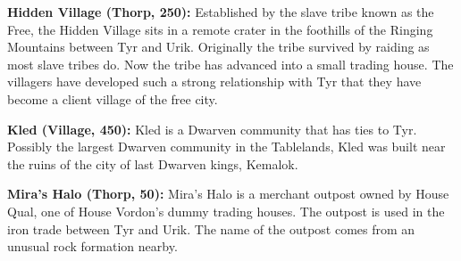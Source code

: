 {
	\textbf{Hidden Village (Thorp, 250):} Established by the slave tribe known as the Free, the Hidden Village sits in a remote crater in the foothills of the Ringing Mountains between Tyr and Urik. Originally the tribe survived by raiding as most slave tribes do. Now the tribe has advanced into a small trading house. The villagers have developed such a strong relationship with Tyr that they have become a client village of the free city.

	\textbf{Kled (Village, 450):} Kled is a Dwarven community that has ties to Tyr. Possibly the largest Dwarven community in the Tablelands, Kled was built near the ruins of the city of last Dwarven kings, Kemalok.

	\textbf{Mira's Halo (Thorp, 50):} Mira's Halo is a merchant outpost owned by House Qual, one of House Vordon's dummy trading houses. The outpost is used in the iron trade between Tyr and Urik. The name of the outpost comes from an unusual rock formation nearby.
}
